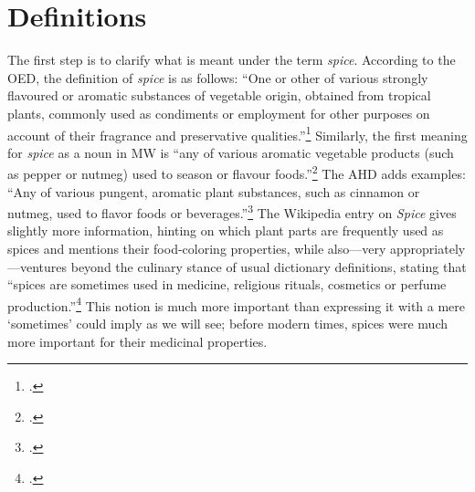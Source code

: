

\section{Definitions}
\label{sec:definitions}

The first step is to clarify what is meant under the term \textit{spice}. According to the \gls{OED}, the definition of \textit{spice} is as follows: ``One or other of various strongly flavoured or aromatic substances of vegetable origin, obtained from tropical plants, commonly used as condiments or employment for other purposes on account of their fragrance and preservative qualities.''\footcite[spice]{oed} Similarly, the first meaning for \textit{spice} as a noun in \gls{MW} is ``any of various aromatic vegetable products (such as pepper or nutmeg) used to season or flavour foods.''\footcite[spice]{mw} The \gls{AHD} adds examples: ``Any of various pungent, aromatic plant substances, such as cinnamon or nutmeg, used to flavor foods or beverages.''\footcite[spice]{ahd} 
The Wikipedia entry on \textit{Spice} gives slightly more information, hinting on which plant parts are frequently used as spices and mentions their food-coloring properties, while also---very appropriately---ventures beyond the culinary stance of usual dictionary definitions, stating that ``spices are sometimes used in medicine, religious rituals, cosmetics or perfume production.''\footcite{wikipedia_spice_2022} This notion is much more important than expressing it with a mere `sometimes' could imply as we will see; before modern times, spices were much more important for their medicinal properties.

